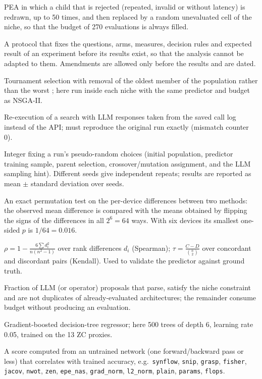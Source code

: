 \documentclass[preprint,12pt]{elsarticle}
\newcommand{\code}[1]{\texttt{#1}}
\begin{document}
\begin{description}[style=nextline,leftmargin=0pt,itemsep=3pt]
\item[PEA with refilling.] PEA in which a child that is rejected (repeated, invalid or without latency) is redrawn, up to 50 times, and then replaced by a random unevaluated cell of the niche, so that the budget of 270 evaluations is always filled.

\item[Pre-registration.] A protocol that fixes the questions, arms, measures, decision rules and expected result of an experiment before its results exist, so that the analysis cannot be adapted to them. Amendments are allowed only before the results and are dated.

\item[Regularised (aging) evolution.] Tournament selection with removal of the oldest member of the population rather than the worst \cite{real19}; here run inside each niche with the same predictor and budget as NSGA-II.

\item[Replay.] Re-execution of a search with LLM responses taken from the saved call log instead of the API; must reproduce the original run exactly (mismatch counter 0).

\item[Seed.] Integer fixing a run's pseudo-random choices (initial population, predictor training sample, parent selection, crossover/mutation assignment, and the LLM sampling hint). Different seeds give independent repeats; results are reported as mean $\pm$ standard deviation over seeds.

\item[Sign-flip test.] An exact permutation test on the per-device differences between two methods: the observed mean difference is compared with the means obtained by flipping the signs of the differences in all $2^6=64$ ways. With six devices its smallest one-sided $p$ is $1/64=0.016$.

\item[Spearman / Kendall rank correlation.] $\rho=1-\frac{6\sum d_i^2}{n(n^2-1)}$ over rank differences $d_i$ (Spearman); $\tau=\frac{C-D}{\binom{n}{2}}$ over concordant and discordant pairs (Kendall). Used to validate the predictor against ground truth.

\item[Usable proposal rate.] Fraction of LLM (or operator) proposals that parse, satisfy the niche constraint and are not duplicates of already-evaluated architectures; the remainder consume budget without producing an evaluation.

\item[XGBoost.] Gradient-boosted decision-tree regressor; here 500 trees of depth 6, learning rate 0.05, trained on the 13 ZC proxies.

\item[Zero-cost (ZC) proxy.] A score computed from an untrained network (one forward/backward pass or less) that correlates with trained accuracy, e.g.\ \code{synflow}, \code{snip}, \code{grasp}, \code{fisher}, \code{jacov}, \code{nwot}, \code{zen}, \code{epe\_nas}, \code{grad\_norm}, \code{l2\_norm}, \code{plain}, \code{params}, \code{flops}.
\end{description}



\end{document}
